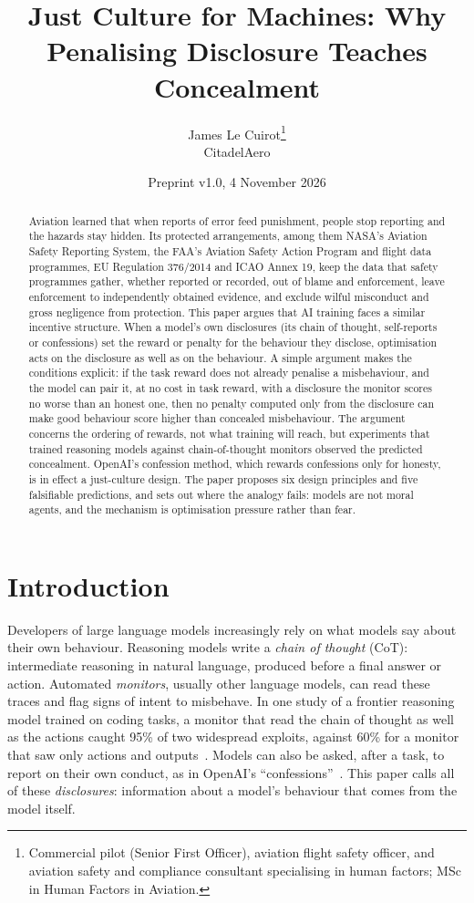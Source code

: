 \documentclass[11pt]{article}
\title{Just Culture for Machines: Why Penalising Disclosure Teaches Concealment}
\author{James Le Cuirot\thanks{Commercial pilot (Senior First Officer), aviation flight safety officer, and aviation safety and compliance consultant specialising in human factors; MSc in Human Factors in Aviation.}\\[2pt] \normalsize CitadelAero}
\date{Preprint v1.0, 4 November 2026}
\begin{document}
\maketitle

\begin{abstract}
Aviation learned that when reports of error feed punishment, people stop reporting and the hazards stay hidden. Its protected arrangements, among them NASA's Aviation Safety Reporting System, the FAA's Aviation Safety Action Program and flight data programmes, EU Regulation 376/2014 and ICAO Annex 19, keep the data that safety programmes gather, whether reported or recorded, out of blame and enforcement, leave enforcement to independently obtained evidence, and exclude wilful misconduct and gross negligence from protection. This paper argues that AI training faces a similar incentive structure. When a model's own disclosures (its chain of thought, self-reports or confessions) set the reward or penalty for the behaviour they disclose, optimisation acts on the disclosure as well as on the behaviour. A simple argument makes the conditions explicit: if the task reward does not already penalise a misbehaviour, and the model can pair it, at no cost in task reward, with a disclosure the monitor scores no worse than an honest one, then no penalty computed only from the disclosure can make good behaviour score higher than concealed misbehaviour. The argument concerns the ordering of rewards, not what training will reach, but experiments that trained reasoning models against chain-of-thought monitors observed the predicted concealment. OpenAI's confession method, which rewards confessions only for honesty, is in effect a just-culture design. The paper proposes six design principles and five falsifiable predictions, and sets out where the analogy fails: models are not moral agents, and the mechanism is optimisation pressure rather than fear.
\end{abstract}

\section{Introduction}\label{sec:intro}

Developers of large language models increasingly rely on what models say about their own behaviour. Reasoning models write a \emph{chain of thought} (CoT): intermediate reasoning in natural language, produced before a final answer or action. Automated \emph{monitors}, usually other language models, can read these traces and flag signs of intent to misbehave. In one study of a frontier reasoning model trained on coding tasks, a monitor that read the chain of thought as well as the actions caught 95\% of two widespread exploits, against 60\% for a monitor that saw only actions and outputs~\cite[Table~1]{baker2025}. Models can also be asked, after a task, to report on their own conduct, as in OpenAI's ``confessions''~\cite{joglekar2025}. This paper calls all of these \emph{disclosures}: information about a model's behaviour that comes from the model itself.
\end{document}

